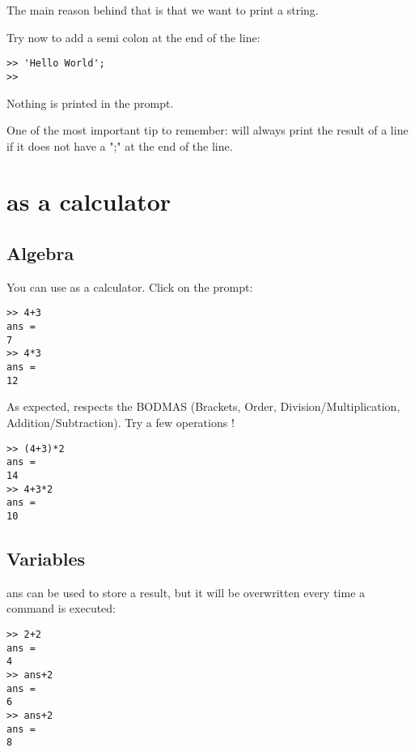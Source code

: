 The main reason behind that is that we want to print a string.



Try now to add a semi colon at the end of the line:
\begin{lstlisting}
>> 'Hello World';
>>
\end{lstlisting}

Nothing is printed in the prompt.


One of the most important tip to remember: \matlab will always print the result of a line if it does not have a ";" at the end of the line.







\section{\matlab as a calculator}
\subsection{Algebra}

You can use \matlab as a calculator. 
Click on the prompt: 

\begin{lstlisting}
>> 4+3
ans =
7
>> 4*3
ans =
12
\end{lstlisting}

As expected, \matlab respects the BODMAS (Brackets, Order, Division/Multiplication, Addition/Subtraction). 
Try a few operations !
\begin{lstlisting}
>> (4+3)*2
ans =
14
>> 4+3*2
ans =
10
\end{lstlisting}

\subsection{Variables}
ans can be used to store a result, but it will be overwritten every time a command is executed:

\begin{lstlisting}
>> 2+2
ans =
4
>> ans+2
ans =
6
>> ans+2
ans =
8
\end{lstlisting}

